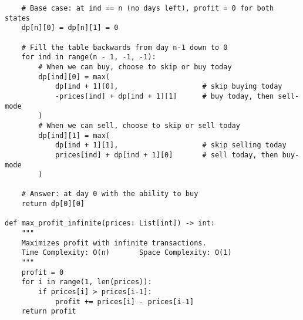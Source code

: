 \begin{verbatim}
    # Base case: at ind == n (no days left), profit = 0 for both states
    dp[n][0] = dp[n][1] = 0

    # Fill the table backwards from day n-1 down to 0
    for ind in range(n - 1, -1, -1):
        # When we can buy, choose to skip or buy today
        dp[ind][0] = max(
            dp[ind + 1][0],                    # skip buying today
            -prices[ind] + dp[ind + 1][1]      # buy today, then sell-mode
        )
        # When we can sell, choose to skip or sell today
        dp[ind][1] = max(
            dp[ind + 1][1],                    # skip selling today
            prices[ind] + dp[ind + 1][0]       # sell today, then buy-mode
        )

    # Answer: at day 0 with the ability to buy
    return dp[0][0]

def max_profit_infinite(prices: List[int]) -> int:
    """
    Maximizes profit with infinite transactions.
    Time Complexity: O(n)       Space Complexity: O(1)
    """
    profit = 0
    for i in range(1, len(prices)):
        if prices[i] > prices[i-1]:
            profit += prices[i] - prices[i-1]
    return profit
\end{verbatim}

